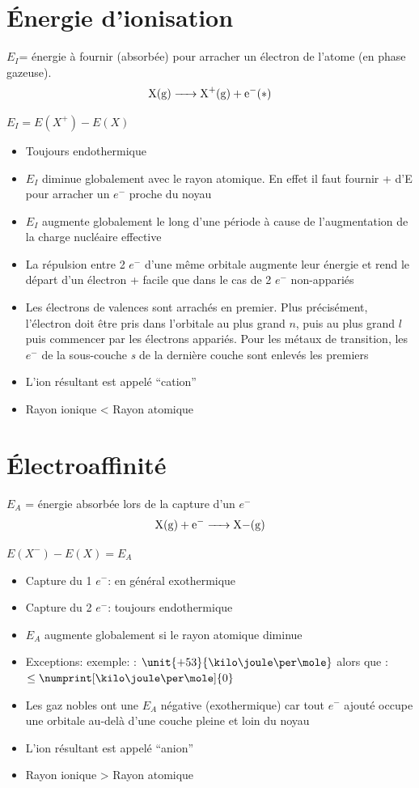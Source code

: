 \documentclass[11pt,a4paper,french]{article}
\begin{document}
\section{\'Energie d'ionisation}
\label{sec:ioni}

$E_I$= énergie à fournir (absorbée) pour arracher un électron de l'atome (en phase gazeuse).
$$\ce{X(g) -> X+(g) + e-}(*)$$

$E_I = E(X^+)-E(X)$

\begin{itemize}
	\item Toujours endothermique
	\item $E_I$ diminue globalement avec le rayon atomique.
		En effet il faut fournir + d'E pour arracher un $e^-$ proche du noyau
	\item $E_I$ augmente globalement le long d'une période à cause de l'augmentation de la charge nucléaire effective
	\item La répulsion entre 2 $e^-$ d'une même orbitale augmente leur énergie et rend le départ d'un électron + facile que dans le cas de 2 $e^-$ non-appariés
	\item Les électrons de valences sont arrachés en premier.
		Plus précisément, l'électron doit être pris dans l'orbitale au plus grand $n$, puis au plus grand $l$ puis commencer par les électrons appariés.
		Pour les métaux de transition, les $e^-$ de la sous-couche \textit{s} de la dernière couche sont enlevés les premiers
	\item L'ion résultant est appelé ``cation''
	\item Rayon ionique < Rayon atomique
\end{itemize}

\section{\'Electroaffinité}
\label{sec:electro}

$E_A$ = énergie absorbée lors de la capture d'un $e^-$
$$\ce{X(g) + e- -> X-(g)}$$

$E(X^-)-E(X)=E_A$

\begin{itemize}
	\item Capture du 1 $e^-$: en général exothermique
	\item Capture du 2 $e^-$: toujours endothermique
	\item $E_A$ augmente globalement si le rayon atomique diminue
	\item Exceptions: exemple: : $\unit{+53}{\kilo\joule\per\mole}$ alors que : $\leq \numprint[\kilo\joule\per\mole]{0}$
	\item Les gaz nobles ont une $E_A$ négative (exothermique) car tout $e^-$ ajouté occupe une orbitale au-delà d'une couche pleine et loin du noyau
	\item L'ion résultant est appelé ``anion''
	\item Rayon ionique > Rayon atomique
\end{itemize}
\end{document}
